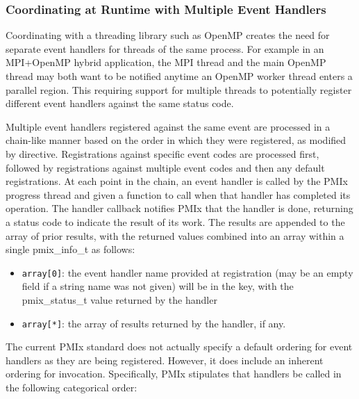 
{\large {}}




\subsubsection{Coordinating at Runtime with Multiple Event Handlers}

Coordinating with a threading library such as OpenMP creates the need for separate event handlers for threads of the same process.  For example in an MPI+OpenMP hybrid application, the MPI thread and the main OpenMP thread may both want to be notified anytime an OpenMP worker thread enters a parallel region.  This requiring support for multiple threads to potentially register different event handlers against the same status code.

Multiple event handlers registered against the same event are processed in a chain-like manner based on the order in which they were registered, as modified by directive. Registrations against specific event codes are processed first, followed by registrations against multiple event codes and then any default registrations. At each point in the chain, an event handler is called by the PMIx progress thread and given a function to call when that handler has completed its operation. The handler callback notifies PMIx that the handler is done, returning a status code to indicate the result of its work. The results are appended to the array of prior results, with the returned values combined into an array within a single pmix_info_t as follows:
\begin{itemize}
\item \texttt{array[0]}: the event handler name provided at registration (may be an empty field if a string name was not given) will be in the key, with the pmix_status_t value returned by the handler
\item \texttt{array[*]}: the array of results returned by the handler, if any.
\end{itemize}

The current PMIx standard does not actually specify a default ordering for event handlers as they are being registered. However, it does include an inherent ordering for invocation. Specifically, PMIx stipulates that handlers be called in the following categorical order:

